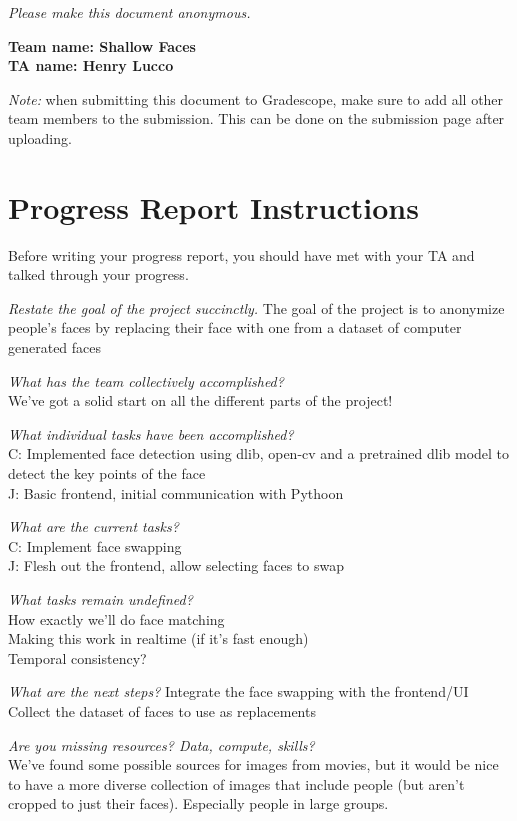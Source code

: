 \emph{Please make this document anonymous.}

\textbf{Team name: Shallow Faces}\\
\textbf{TA name: Henry Lucco}

\emph{Note:} when submitting this document to Gradescope, make sure to add all other team members to the submission. This can be done on the submission page after uploading.

\section*{Progress Report Instructions}

Before writing your progress report, you should have met with your TA and talked through your progress.

%
\textit{Restate the goal of the project succinctly.}
The goal of the project is to anonymize people's faces by replacing their face with one from a dataset of computer generated faces

\textit{What has the team collectively accomplished?}\\
We've got a solid start on all the different parts of the project!

\textit{What individual tasks have been accomplished?}\\
C: Implemented face detection using dlib, open-cv and a pretrained dlib model to detect the key points of the face\\
J: Basic frontend, initial communication with Pythoon

\textit{What are the current tasks?}\\
C: Implement face swapping\\
J: Flesh out the frontend, allow selecting faces to swap

\textit{What tasks remain undefined?}\\
How exactly we'll do face matching\\
Making this work in realtime (if it's fast enough)\\
Temporal consistency?

\textit{What are the next steps?}
Integrate the face swapping with the frontend/UI\\
Collect the dataset of faces to use as replacements

%
\textit{Are you missing resources? Data, compute, skills?}\\
We've found some possible sources for images from movies, but it would be nice to have a more diverse collection of images that include people (but aren't cropped to just their faces). Especially people in large groups.


